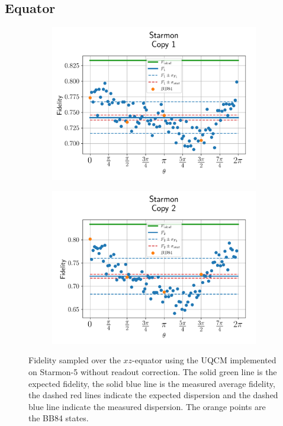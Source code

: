 \subsection{Equator}

\begin{figure}[H]
    \centering
    \begin{subfigure}{.45\textwidth}
      \centering
      \includegraphics[width=\textwidth]{Figures/UQCM/Starmon/OnlyEquator/results_starmon5_copy1.png}
    \end{subfigure}%
    \begin{subfigure}{.45\textwidth}
      \centering
      \includegraphics[width=\textwidth]{Figures/UQCM/Starmon/OnlyEquator/results_starmon5_copy2.png}
    \end{subfigure}
    \caption{Fidelity sampled over the $xz$-equator using the UQCM implemented on Starmon-5 without readout correction. The solid green line is the expected fidelity, the solid blue line is the measured average fidelity, the dashed red lines indicate the expected dispersion and the dashed blue line indicate the measured dispersion. The orange points are the BB84 states.}
\end{figure}


